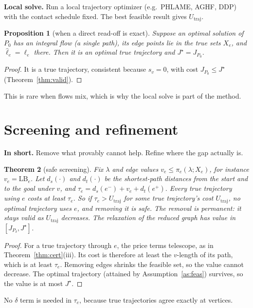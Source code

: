 \documentclass[11pt]{article}
\newcommand{\Jd}{J_{P_\delta}}
\newcommand{\Utraj}{U_{\mathrm{traj}}}
\newcommand{\LB}{\mathrm{LB}}
\newcommand{\inshort}[1]{\par\noindent\textcolor{accent}{\textbf{In short.}} #1\par\smallskip}
\theoremstyle{plain}
\newtheorem{theorem}{Theorem}[section]
\newtheorem{proposition}[theorem]{Proposition}
\theoremstyle{definition}
\theoremstyle{remark}
\begin{document}
\textbf{Local solve.} Run a local trajectory optimizer (e.g.\ PHLAME, AGHF, DDP) with the contact schedule fixed. The best feasible result gives $\Utraj$.

\begin{proposition}[when a direct read-off is exact]\label{prop:readoff}
Suppose an optimal solution of $P_0$ has an integral flow (a single path), its edge points lie in the true sets $X_e$, and $\hat\ell_e=\ell_e$ there. Then it is an optimal true trajectory and $J^\star=J_{P_0}$.
\end{proposition}
\begin{proof}
It is a true trajectory, consistent because $s_v=0$, with cost $J_{P_0}\le J^\star$ (Theorem~\ref{thm:valid}).
\end{proof}
This is rare when flows mix, which is why the local solve is part of the method.

\section{Screening and refinement}\label{sec:screen}
\inshort{Remove what provably cannot help. Refine where the gap actually is.}

\begin{theorem}[safe screening]\label{thm:screen}
Fix $\lambda$ and edge values $v_e\le\pi_e(\lambda;X_e)$, for instance $v_e=\LB_e$. Let $d_s(\cdot)$ and $d_t(\cdot)$ be the shortest-path distances from the start and to the goal under $v$, and $\tau_e=d_s(e^-)+v_e+d_t(e^+)$. Every true trajectory using $e$ costs at least $\tau_e$. So if $\tau_e>\Utraj$ for some true trajectory's cost $\Utraj$, no optimal trajectory uses $e$, and removing it is safe. The removal is permanent: it stays valid as $\Utraj$ decreases. The relaxation of the reduced graph has value in $[\Jd,J^\star]$.
\end{theorem}
\begin{proof}
For a true trajectory through $e$, the price terms telescope, as in Theorem~\ref{thm:cert}(iii). Its cost is therefore at least the $v$-length of its path, which is at least $\tau_e$. Removing edges shrinks the feasible set, so the value cannot decrease. The optimal trajectory (attained by Assumption~\ref{as:feas}) survives, so the value is at most $J^\star$.
\end{proof}
No $\delta$ term is needed in $\tau_e$, because true trajectories agree exactly at vertices.
\end{document}
